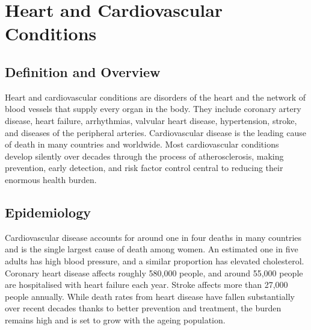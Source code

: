 \chapter{Heart and Cardiovascular Conditions}

\section*{Definition and Overview}
Heart and cardiovascular conditions are disorders of the heart and the network of blood vessels that supply every organ in the body. They include coronary artery disease, heart failure, arrhythmias, valvular heart disease, hypertension, stroke, and diseases of the peripheral arteries. Cardiovascular disease is the leading cause of death in many countries and worldwide. Most cardiovascular conditions develop silently over decades through the process of atherosclerosis, making prevention, early detection, and risk factor control central to reducing their enormous health burden.

\section*{Epidemiology}
Cardiovascular disease accounts for around one in four deaths in many countries and is the single largest cause of death among women. An estimated one in five adults has high blood pressure, and a similar proportion has elevated cholesterol. Coronary heart disease affects roughly 580,000 people, and around 55,000 people are hospitalised with heart failure each year. Stroke affects more than 27,000 people annually. While death rates from heart disease have fallen substantially over recent decades thanks to better prevention and treatment, the burden remains high and is set to grow with the ageing population.

